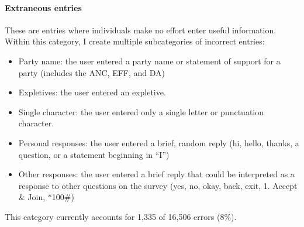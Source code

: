 \documentclass[12pt]{article}
\begin{document}
\paragraph{Extraneous entries} These are entries where individuals make no effort enter useful information. Within this category, I create multiple subcategories of incorrect entries: 
\begin{itemize}
\item Party name: the user entered a party name or statement of support for a party (includes the ANC, EFF, and DA)
\item Expletives: the user entered an expletive. 
\item Single character: the user entered only a single letter or punctuation character. 
\item Personal responses: the user entered a brief, random reply (hi, hello, thanks, a question, or a statement beginning in ``I'') 
\item Other responses: the user entered a brief reply that could be interpreted as a response to other questions on the survey (yes, no, okay, back, exit, 1. Accept \& Join, $\ast$100\#) 

\end{itemize}
This category currently accounts for  1,335 of 16,506 errors (8\%). 

\iffalse
\begin{tabular}{ r|c|c| }
\multicolumn{1}{r}{}
 &  \multicolumn{1}{c}{}
 & \multicolumn{1}{c}{} \\
\cline{2-3}
 &  &  \\
\cline{2-3}
 &  &  \\
\cline{2-3}
\end{tabular}
\fi
\end{document}
